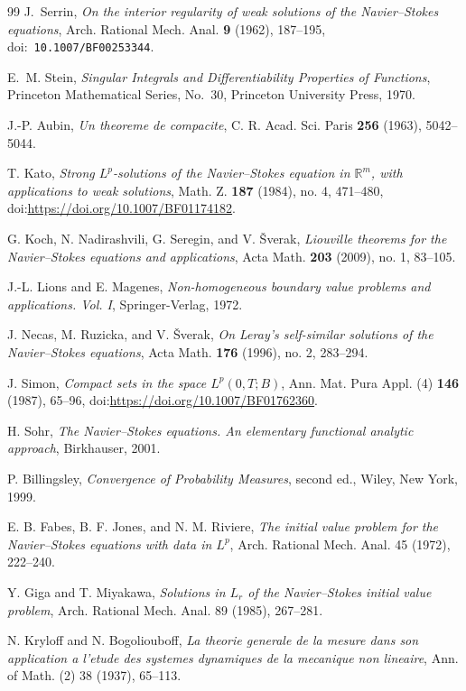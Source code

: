 \documentclass[11pt]{amsart}
\theoremstyle{plain}
\theoremstyle{definition}
\theoremstyle{remark}
\numberwithin{equation}{section}
\begin{document}
\begin{thebibliography}{99}
J.~Serrin,
\emph{On the interior regularity of weak solutions of the Navier--Stokes
 equations},
Arch. Rational Mech. Anal. \textbf{9} (1962), 187--195,
doi:\ \nolinkurl{10.1007/BF00253344}.

E.~M. Stein,
\emph{Singular Integrals and Differentiability Properties of Functions},
Princeton Mathematical Series, No.~30, Princeton University Press, 1970.

J.-P. Aubin,
\emph{Un theoreme de compacite},
C. R. Acad. Sci. Paris \textbf{256} (1963), 5042--5044.

T. Kato,
\emph{Strong \(L^p\)-solutions of the Navier--Stokes equation in
\(\mathbb R^m\), with applications to weak solutions},
Math. Z. \textbf{187} (1984), no. 4, 471--480,
doi:\url{https://doi.org/10.1007/BF01174182}.

G. Koch, N. Nadirashvili, G. Seregin, and V. \v{S}verak,
\emph{Liouville theorems for the Navier--Stokes equations and applications},
Acta Math. \textbf{203} (2009), no. 1, 83--105.

J.-L. Lions and E. Magenes,
\emph{Non-homogeneous boundary value problems and applications. Vol. I},
Springer-Verlag, 1972.

J. Necas, M. Ruzicka, and V. \v{S}verak,
\emph{On Leray's self-similar solutions of the Navier--Stokes equations},
Acta Math. \textbf{176} (1996), no. 2, 283--294.

J. Simon,
\emph{Compact sets in the space \(L^p(0,T;B)\)},
Ann. Mat. Pura Appl. (4) \textbf{146} (1987), 65--96,
doi:\url{https://doi.org/10.1007/BF01762360}.

H. Sohr,
\emph{The Navier--Stokes equations. An elementary functional analytic approach},
Birkhauser, 2001.

P. Billingsley,
\emph{Convergence of Probability Measures}, second ed.,
Wiley, New York, 1999.

E. B. Fabes, B. F. Jones, and N. M. Riviere,
\emph{The initial value problem for the Navier--Stokes equations with data in
\(L^p\)},
Arch. Rational Mech. Anal. 45 (1972), 222--240.

Y. Giga and T. Miyakawa,
\emph{Solutions in \(L_r\) of the Navier--Stokes initial value problem},
Arch. Rational Mech. Anal. 89 (1985), 267--281.

N. Kryloff and N. Bogoliouboff,
\emph{La theorie generale de la mesure dans son application a l'etude des
systemes dynamiques de la mecanique non lineaire},
Ann. of Math. (2) 38 (1937), 65--113.


\end{thebibliography}
\end{document}
